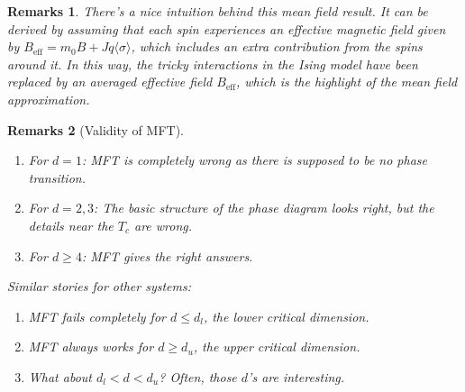 \documentclass[a4paper]{article}
\newtheorem{remarks}{Remarks}[section]
\theoremstyle{new}
\begin{document}
\begin{remarks}
There’s a nice intuition behind this mean field result. It can be derived by assuming that each spin experiences an effective magnetic field given by $B_{\text{eff}} = m_0B +Jq\langle\sigma\rangle$, which includes an extra contribution from the spins around it. In this way, the tricky interactions in the Ising model have been replaced by an averaged effective field $B_{\text{eff}}$, which is the highlight of the mean field approximation.
\end{remarks}
\begin{remarks}[Validity of MFT]\leavevmode
\begin{enumerate}
    \item For $d=1$: MFT is completely wrong as there is supposed to be no phase transition.
    \item For $d=2,3$: The basic structure of the phase diagram looks right, but the details near the $T_c$ are wrong.
    \item For $d\geq4$: MFT gives the right answers.
\end{enumerate}
Similar stories for other systems:
\begin{enumerate}
    \item MFT fails completely for $d\leq d_l$, the lower critical dimension.
    \item MFT always works for $d\geq d_u$, the upper critical dimension.
    \item What about $d_l<d<d_u$? Often, those $d$'s are interesting.
\end{enumerate}
\end{remarks}
\newpage
\end{document}
